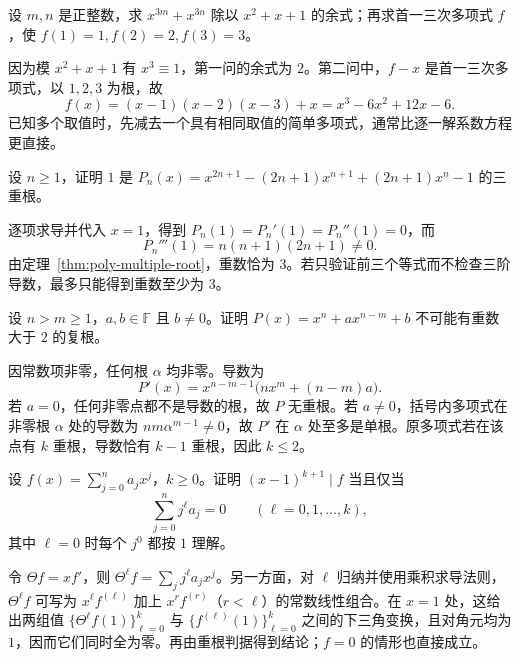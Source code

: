 \begin{example}
\label{ex:poly-training-remainders}
设 $m,n$ 是正整数，求 $x^{3m}+x^{3n}$ 除以 $x^2+x+1$ 的余式；再求首一三次多项式 $f$，使 $f(1)=1,f(2)=2,f(3)=3$。
\end{example}
\begin{solve}
因为模 $x^2+x+1$ 有 $x^3\equiv1$，第一问的余式为 $2$。第二问中，$f-x$ 是首一三次多项式，以 $1,2,3$ 为根，故
\[
    f(x)=(x-1)(x-2)(x-3)+x=x^3-6x^2+12x-6.
\]
已知多个取值时，先减去一个具有相同取值的简单多项式，通常比逐一解系数方程更直接。
\end{solve}

\begin{example}
\label{ex:poly-training-triple-root}
设 $n\geq1$，证明 $1$ 是 $P_n(x)=x^{2n+1}-(2n+1)x^{n+1}+(2n+1)x^n-1$ 的三重根。
\end{example}
\begin{solve}
逐项求导并代入 $x=1$，得到 $P_n(1)=P_n'(1)=P_n''(1)=0$，而
\[
    P_n'''(1)=n(n+1)(2n+1)\ne0.
\]
由定理~\ref{thm:poly-multiple-root}，重数恰为 $3$。若只验证前三个等式而不检查三阶导数，最多只能得到重数至少为 $3$。
\end{solve}

\begin{example}
\label{ex:poly-training-trinomial-multiplicity}
设 $n>m\geq1$，$a,b\in\mathbb F$ 且 $b\ne0$。证明 $P(x)=x^n+ax^{n-m}+b$ 不可能有重数大于 $2$ 的复根。
\end{example}
\begin{solve}
因常数项非零，任何根 $\alpha$ 均非零。导数为
\[
    P'(x)=x^{n-m-1}\bigl(nx^m+(n-m)a\bigr).
\]
若 $a=0$，任何非零点都不是导数的根，故 $P$ 无重根。若 $a\ne0$，括号内多项式在非零根 $\alpha$ 处的导数为 $nm\alpha^{m-1}\ne0$，故 $P'$ 在 $\alpha$ 处至多是单根。原多项式若在该点有 $k$ 重根，导数恰有 $k-1$ 重根，因此 $k\leq2$。
\end{solve}

\begin{example}
\label{ex:poly-training-euler-operator}
设 $f(x)=\sum_{j=0}^n a_jx^j$，$k\geq0$。证明 $(x-1)^{k+1}\mid f$ 当且仅当
\[
    \sum_{j=0}^n j^\ell a_j=0\qquad(\ell=0,1,\ldots,k),
\]
其中 $\ell=0$ 时每个 $j^0$ 都按 $1$ 理解。
\end{example}
\begin{solve}
令 $\Theta f=xf'$，则 $\Theta^\ell f=\sum_j j^\ell a_jx^j$。另一方面，对 $\ell$ 归纳并使用乘积求导法则，$\Theta^\ell f$ 可写为 $x^\ell f^{(\ell)}$ 加上 $x^rf^{(r)}$（$r<\ell$）的常数线性组合。在 $x=1$ 处，这给出两组值 $\{\Theta^\ell f(1)\}_{\ell=0}^k$ 与 $\{f^{(\ell)}(1)\}_{\ell=0}^k$ 之间的下三角变换，且对角元均为 $1$，因而它们同时全为零。再由重根判据得到结论；$f=0$ 的情形也直接成立。
\end{solve}

